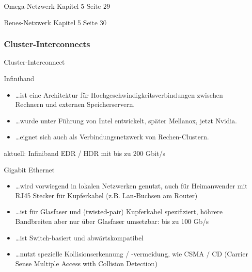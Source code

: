 \begin{defi}{Omega-Netzwerk}
    Kapitel 5 Seite 29
\end{defi}

\begin{defi}{Benes-Netzwerk}
    Kapitel 5 Seite 30
\end{defi}

\subsubsection{Cluster-Interconnects}

\begin{defi}{Cluster-Interconnect}
    
\end{defi}

\begin{defi}{Infiniband}
    \begin{itemize}
        \item \ldots ist eine Architektur für Hochgeschwindigkeitsverbindungen zwischen Rechnern und externen Speicherservern.
        \item \ldots wurde unter Führung von Intel entwickelt, später Mellanox, jetzt Nvidia.
        \item \ldots eignet sich auch als Verbindungsnetzwerk von Rechen-Clustern.
    \end{itemize}
    aktuell: Infiniband EDR / HDR mit bis zu 200 Gbit/s
\end{defi}

\begin{defi}{Gigabit Ethernet}
    \begin{itemize}
        \item \ldots wird vorwiegend in lokalen Netzwerken genutzt, 
        auch für Heimanwender mit RJ45 Stecker für Kupferkabel (z.B. Lan-Buchsen am Router)
        \item \ldots ist für Glasfaser und (twisted-pair) Kupferkabel spezifiziert, 
        höhrere Bandbreiten aber nur über Glasfaser umsetzbar: bis zu 100 Gb/s
        \item \ldots ist Switch-basiert und abwärtskompatibel
        \item \ldots nutzt spezielle Kollisionserkennung / -vermeidung, 
        wie CSMA / CD (Carrier Sense Multiple Access with Collision Detection)
    \end{itemize}
\end{defi}

